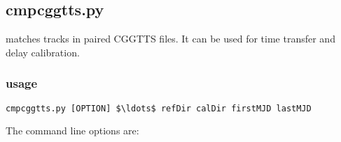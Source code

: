\subsection{cmpcggtts.py}

\hypertarget{h:cmpcggtts}{}

 matches tracks in paired CGGTTS files. It can be used for time transfer and delay calibration. 

\subsubsection{usage}

\begin{lstlisting}[mathescape=true]
cmpcggtts.py [OPTION] $\ldots$ refDir calDir firstMJD lastMJD
\end{lstlisting}
The command line options are:
